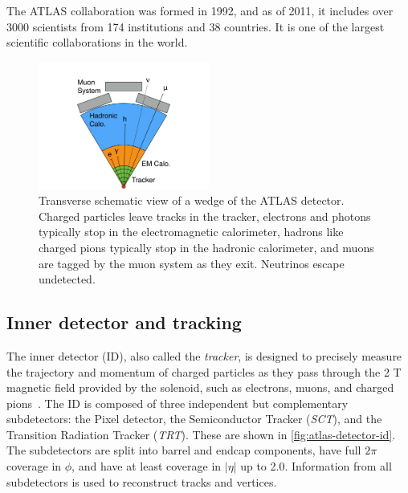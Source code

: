 The ATLAS collaboration was formed in 1992, and as of 2011, it includes over 3000 scientists from 174 institutions and 38 countries. It is one of the largest scientific collaborations in the world.

\begin{figure}[tp]
  \centering
  \includegraphics[width=0.5\textwidth]{figures/lhc-atlas/atlas-wedge-cartoon}
  \caption{Transverse schematic view of a wedge of the ATLAS detector. Charged particles leave tracks in the tracker, electrons and photons typically stop in the electromagnetic calorimeter, hadrons like charged pions typically stop in the hadronic calorimeter, and muons are tagged by the muon system as they exit. Neutrinos escape undetected.}
  \label{fig:atlas-wedge}
\end{figure}

\subsection{Inner detector and tracking}

The inner detector (ID), also called the \textit{tracker}, is designed to precisely measure the trajectory and momentum of charged particles as they pass through the 2 T magnetic field provided by the solenoid, such as electrons, muons, and charged pions~\cite{cern-jinst-atlas}. The ID is composed of three independent but complementary subdetectors: the Pixel detector, the Semiconductor Tracker (\textit{SCT}), and the Transition Radiation Tracker (\textit{TRT}). These are shown in \cref{fig:atlas-detector-id}. The subdetectors are split into barrel and endcap components, have full $2\pi$ coverage in $\phi$, and have at least coverage in $|\eta|$ up to 2.0. Information from all subdetectors is used to reconstruct tracks and vertices.

